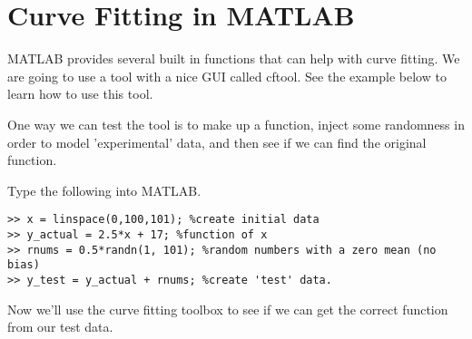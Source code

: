 \documentclass[paper=a4, fontsize=11pt]{scrartcl} %
\numberwithin{equation}{section} %
\numberwithin{figure}{section} %
\numberwithin{table}{section} %
\begin{document}
\section{Curve Fitting in MATLAB}
MATLAB provides several built in functions that can help with curve fitting.
We are going to use a tool with a nice GUI called cftool.
See the example below to learn how to use this tool.

One way we can test the tool is to make up a function, inject some randomness in order to model 'experimental' data, and then see if we can find the original function.

Type the following into MATLAB.
\begin{verbatim}
>> x = linspace(0,100,101); %create initial data
>> y_actual = 2.5*x + 17; %function of x
>> rnums = 0.5*randn(1, 101); %random numbers with a zero mean (no bias)
>> y_test = y_actual + rnums; %create 'test' data.
\end{verbatim}

Now we'll use the curve fitting toolbox to see if we can get the correct function from our test data.
\end{document}

